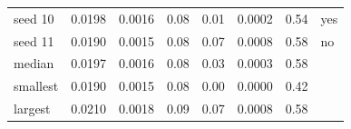 \begin{tabular}{lrrrrrrl}
seed 10 & 0.0198 & 0.0016 & 0.08 & 0.01 & 0.0002 & 0.54 & yes \\
seed 11 & 0.0190 & 0.0015 & 0.08 & 0.07 & 0.0008 & 0.58 & no \\
\midrule
median & 0.0197 & 0.0016 & 0.08 & 0.03 & 0.0003 & 0.58 &  \\
smallest & 0.0190 & 0.0015 & 0.08 & 0.00 & 0.0000 & 0.42 &  \\
largest & 0.0210 & 0.0018 & 0.09 & 0.07 & 0.0008 & 0.58 &  \\
\bottomrule
\end{tabular}
